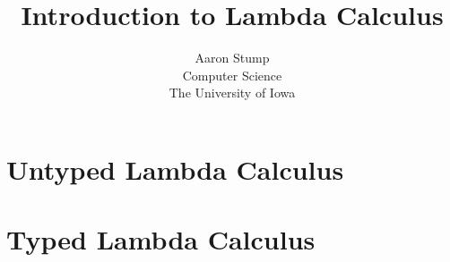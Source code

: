 \documentclass{book}[12pt]
\begin{document}
\title{Introduction to Lambda Calculus}

\author{Aaron Stump \\
Computer Science \\
The University of Iowa
}

\maketitle
\frontmatter

\tableofcontents

\mainmatter



\part{Untyped Lambda Calculus}




%

\part{Typed Lambda Calculus}








\end{document}
